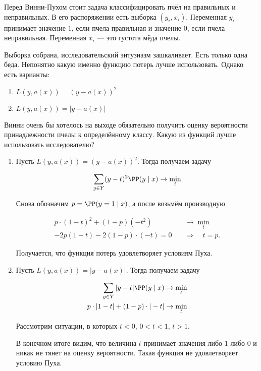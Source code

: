 \begin{problem}\label{log_reg_2}
Перед Винни-Пухом стоит задача классифицировать пчёл на правильных и неправильных. В его распоряжении есть выборка $(y_i,x_i)$. Переменная $y_i$ принимает значение $1$, если пчела правильная и значение $0$, если пчела неправильная. Переменная $x_i$ --- это густота мёда пчелы. 

Выборка собрана, исследовательский энтузиазм зашкаливает. Есть только одна беда. Непонятно какую именно функцию потерь лучше использовать. Однако есть варианты: 

\begin{enumerate}\label{abs_0_1}
\item $L(y,a(x)) = (y - a(x))^2$
\item $L(y,a(x)) = |y - a(x)|$

\end{enumerate}

Винни очень бы хотелось на выходе обязательно получить оценку вероятности принадлежности пчелы к определённому классу. Какую из функций лучше использовать исследователю? 

\begin{sol}

\begin{enumerate}
\item Пусть $L(y,a(x)) = (y - a(x))^2$. Тогда получаем задачу 

\[
\sum_{y \in Y} (y - t)^2 \PP(y \mid x) \to \min_t
\]

Снова обозначим $ p = \PP(y = 1 \mid x)$, а после возьмём производную

\begin{align*}
p \cdot (1 - t)^2 + (1 - p) (-t^2) &\to \min_t \\
-2p(1-t) - 2(1-p)\cdot(-t) = 0 \quad &\Rightarrow \quad t = p.
\end{align*}

Получается, что функция потерь удовлетворяет условиям Пуха. 

\item Пусть $L(y,a(x)) = |y - a(x)|$. Тогда получаем задачу 


\begin{align*}
\sum_{y \in Y} |y - t| \PP(y \mid x) &\to \min_t \\ 
p \cdot |1-t| + (1-p) \cdot |-t| & \to \min_t
\end{align*}

Рассмотрим ситуации, в которых $t<0$, $0 < t < 1$, $t >1$. 


В конечном итоге видим, что величина $t$ принимает значения либо $1$ либо $0$ и никак не тянет на оценку вероятности. Такая функция не удовлетворяет условию Пуха. 


\end{enumerate}
\end{sol}
\end{problem}

